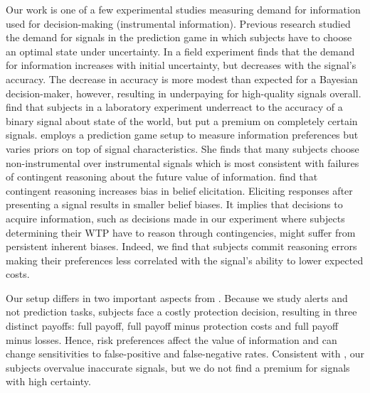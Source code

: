 \documentclass[12pt,a4paper]{article}
\begin{document}
Our work is one of a few experimental studies measuring demand for information used for decision-making (instrumental information). Previous research studied the demand for signals in the prediction game in which subjects have to choose an optimal state under uncertainty. In a field experiment \citet{hoffman_how_2016} finds that the demand for information increases with initial uncertainty, but decreases with the signal's accuracy. The decrease in accuracy is more modest than expected for a Bayesian decision-maker, however, resulting in underpaying for high-quality signals overall. \citet{ambuehl_belief_2018} find that subjects in a laboratory experiment underreact to the accuracy of a binary signal about state of the world, but put a premium on completely certain signals. \citet{xu_revealed_2022} employs a prediction game setup to measure information preferences but varies priors on top of signal characteristics. She finds that many subjects choose non-instrumental over instrumental signals which is most consistent with failures of contingent reasoning about the future value of information.  \citet{aina_contingent_2023} find that contingent reasoning increases bias in belief elicitation. Eliciting responses after presenting a signal results in smaller belief biases.  It implies that decisions to acquire information, such as decisions made in our experiment where subjects determining their WTP have to reason through contingencies, might suffer from persistent inherent biases.  Indeed, we find that subjects commit reasoning errors making their preferences less correlated with the signal's ability to lower expected costs. 

Our setup differs in two important aspects from \citep*{ambuehl_belief_2018, xu_revealed_2022}.  Because we study alerts and not prediction tasks, subjects face a costly protection decision, resulting in three distinct payoffs: full payoff, full payoff minus protection costs and full payoff minus losses. Hence, risk preferences affect the value of information and can change sensitivities to false-positive and false-negative rates. Consistent with \citet{ambuehl_belief_2018}, our subjects overvalue inaccurate signals, but we do not find a premium for signals with high certainty.  
\end{document}
